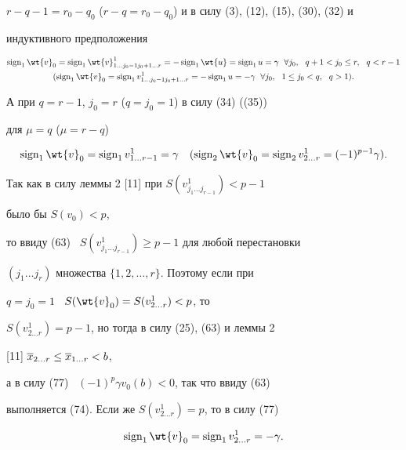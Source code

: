 \begin{pf}
$r-q-1=r_0-q_0$ ($r-q=r_0-q_0$) и в силу (3), (12), (15), (30), (32) и


индуктивного предположения


\begin{gather}


\sign_1\wt{v}_0=\sign_1\wt{v}^1_


{1\dotsc j_0-1j_0+1\dotsc r}=-\sign_1\wt{u}=\sign_1 u=\gamma


\ \; \forall j_0,\ \ q+1<j_0\le r,\ \ q<r-1 \\


%


(\sign_1\wt{v}_0=\sign_1 v^1_{1\dotsc j_0-1j_0+1\dotsc r}=


-\sign_1 u=-\gamma\ \; \forall j_0,\ \ 1\le j_0<q,\ \ q>1).


\end{gather}


А при $q=r-1$, $j_0=r$ ($q=j_0=1$) в силу (34) ((35))


для $\mu=q$ ($\mu=r-q$)


\begin{equation}


\sign_1\wt{v}_0=\sign_1 v^1_{1\dotsc r-1}=\gamma\quad 


(\sign_2\wt{v}_0=\sign_2 v^1_{2\dotsc r}=(-1)^{p-1}\gamma).


\end{equation}





Так как в силу леммы 2 [11] при $S(v^1_{j_1\dotsc j_{r-1}})<p-1$ 


было бы $S(v_0)<p$,


то ввиду (63) \ $S(v^1_{j_1\dotsc j_{r-1}})\ge p-1$ для любой перестановки


$(j_1\dotsc j_r)$ множества $\{1,2,\dotsc,r\}$. Поэтому если при 


$q=j_0=1$ \ $S(\wt{v}_0)=S( v^1_{2\dotsc r})<p$, то


$S( v^1_{2\dotsc r})=p-1$, но тогда в силу (25), (63) и леммы 2


[11] $\overline{x}_{2\dotsc r}\le\overline{x}_{1\dotsc r}<b$,


а в силу (77) \ $(-1)^p\gamma v_0(b)<0$, так что ввиду (63) 


выполняется (74). Если же $S( v^1_{2\dotsc r})=p$, то в силу (77)


\begin{equation}


\sign_1\wt{v}_0=\sign_1 v^1_{2\dotsc r}=-\gamma.



\end{equation}
\end{pf}
